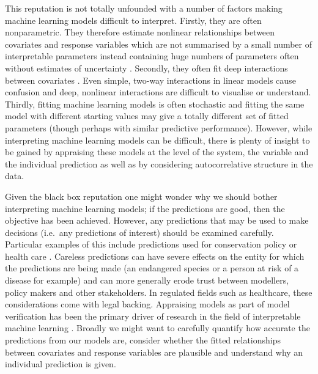 \documentclass[12pt,]{article}
\begin{document}
This reputation is not totally unfounded with a number of factors making machine learning models difficult to interpret.
Firstly, they are often nonparametric.
They therefore estimate nonlinear relationships between covariates and response variables which are not summarised by a small number of interpretable parameters instead containing huge numbers of parameters often without estimates of uncertainty \citep{domingos}.
Secondly, they often fit deep interactions between covariates \citep{lunetta2004screening}.
Even simple, two-way interactions in linear models cause confusion \citep{engqvist2005mistreatment, lamina2012visualizing} and deep, nonlinear interactions are difficult to visualise or understand.
Thirdly, fitting machine learning models is often stochastic \citep{breiman2001random, glorot2002understanding} and fitting the same model with different starting values may give a totally different set of fitted parameters (though perhaps with similar predictive performance).
However, while interpreting machine learning models can be difficult, there is plenty of insight to be gained by appraising these models at the level of the system, the variable and the individual prediction as well as by considering autocorrelative structure in the data.

Given the black box reputation one might wonder why we should bother interpreting machine learning models; if the predictions are good, then the objective has been achieved.
However, any predictions that may be used to make decisions (i.e.~any predictions of interest) should be examined carefully.
Particular examples of this include predictions used for conservation policy or health care \citep{vayena2018machine}.
Careless predictions can have severe effects on the entity for which the predictions are being made (an endangered species or a person at risk of a disease for example) and can more generally erode trust between modellers, policy makers and other stakeholders.
In regulated fields such as healthcare, these considerations come with legal backing.
Appraising models as part of model verification has been the primary driver of research in the field of interpretable machine learning \citep{molnar, ribeiro2016should}.
Broadly we might want to carefully quantify how accurate the predictions from our models are, consider whether the fitted relationships between covariates and response variables are plausible and understand why an individual prediction is given.
\end{document}
